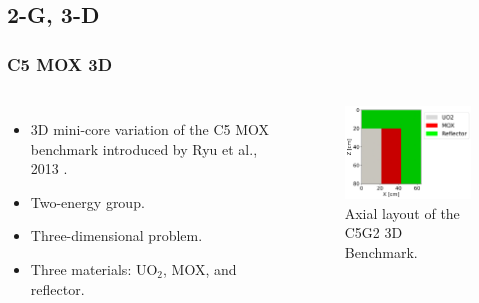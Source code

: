 \subsection{2-G, 3-D}

\begin{frame}
\frametitle{C5 MOX 3D}

\begin{columns}
    \column[t]{4cm}
    \begin{itemize}
        \item 3D mini-core variation of the C5 MOX benchmark introduced by Ryu et al., 2013 \cite{ryu_finite_2013}.
        \item Two-energy group.
        \item Three-dimensional problem.
        \item Three materials: UO$_2$, MOX, and reflector.
    \end{itemize}

    \column[t]{6cm}
    \begin{figure}[htbp!]
        \begin{center}
            \includegraphics[width=6cm]{figures/geo-xz2}
        \end{center}
        \caption{Axial layout of the C5G2 3D Benchmark.}
    \end{figure}
\end{columns}
\end{frame}


